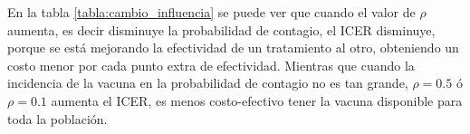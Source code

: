 \documentclass[12pt]{article}
\begin{document}
En la tabla \ref{tabla:cambio_influencia} se puede ver que cuando el valor de $\rho$ aumenta, es decir disminuye la probabilidad de contagio, el ICER disminuye, porque se está mejorando la efectividad de un tratamiento al otro, obteniendo un costo menor por cada punto extra de efectividad. Mientras que cuando la incidencia de la vacuna en la probabilidad de contagio no es tan grande, $\rho=0.5$ ó $\rho=0.1$ aumenta el ICER, es menos costo-efectivo tener la vacuna disponible para toda la población.
\end{document}
